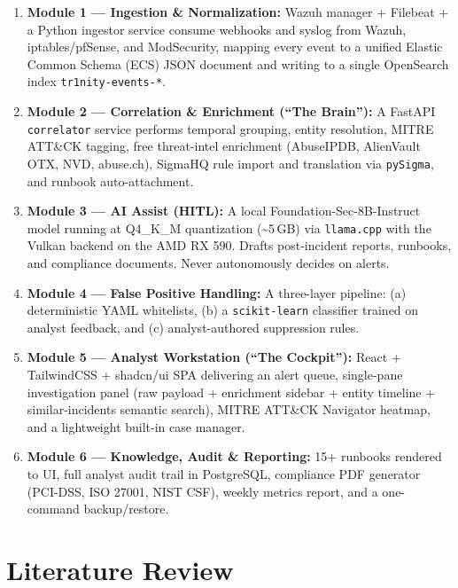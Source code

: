 \documentclass[11pt,a4paper]{article}
\begin{document}
\begin{enumerate}[leftmargin=*, itemsep=2pt]
  \item \textbf{Module 1 — Ingestion \& Normalization:} Wazuh manager + Filebeat + a Python ingestor service consume webhooks and syslog from Wazuh, iptables/pfSense, and ModSecurity, mapping every event to a unified Elastic Common Schema (ECS) JSON document and writing to a single OpenSearch index \texttt{tr1nity-events-*}.
  \item \textbf{Module 2 — Correlation \& Enrichment (``The Brain''):} A FastAPI \texttt{correlator} service performs temporal grouping, entity resolution, MITRE ATT\&CK tagging, free threat-intel enrichment (AbuseIPDB, AlienVault OTX, NVD, abuse.ch), SigmaHQ rule import and translation via \texttt{pySigma}, and runbook auto-attachment.
  \item \textbf{Module 3 — AI Assist (HITL):} A local Foundation-Sec-8B-Instruct model running at Q4\_K\_M quantization (\textasciitilde{}5\,GB) via \texttt{llama.cpp} with the Vulkan backend on the AMD RX 590. Drafts post-incident reports, runbooks, and compliance documents. Never autonomously decides on alerts.
  \item \textbf{Module 4 — False Positive Handling:} A three-layer pipeline: (a) deterministic YAML whitelists, (b) a \texttt{scikit-learn} classifier trained on analyst feedback, and (c) analyst-authored suppression rules.
  \item \textbf{Module 5 — Analyst Workstation (``The Cockpit''):} React + TailwindCSS + shadcn/ui SPA delivering an alert queue, single-pane investigation panel (raw payload + enrichment sidebar + entity timeline + similar-incidents semantic search), MITRE ATT\&CK Navigator heatmap, and a lightweight built-in case manager.
  \item \textbf{Module 6 — Knowledge, Audit \& Reporting:} 15+ runbooks rendered to UI, full analyst audit trail in PostgreSQL, compliance PDF generator (PCI-DSS, ISO 27001, NIST CSF), weekly metrics report, and a one-command backup/restore.
\end{enumerate}

\newpage
\section{Literature Review}
\label{sec:litreview}
\end{document}
